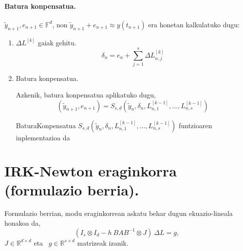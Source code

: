\paragraph*{Batura konpensatua.}

$\tilde{y}_{n+1}, e_{n+1} \in \mathbb{F}^d$, non $\tilde{y}_{n+1}+e_{n+1}\approx y(t_{n+1})$ era honetan kalkulatuko dugu:
\begin{enumerate}

\item $\Delta L^{[k]}$ gaiak gehitu.
\begin{equation*}
\delta_{n}={e}_{n} + \sum\limits_{j=1}^{s}\Delta L_{n,j}^{[k]}
\end{equation*}

\item Batura konpensatua.

Azkenik, batura konpensatua aplikatuko dugu,
\begin{equation}
\label{eq:bkLi2}
(\tilde y_{n+1}, e_{n+1}) = S_{s,d}(\tilde y_n, \delta_n, L_{n,1}^{[k-1]}, \dots,L_{n,s}^{[k-1]})
\end{equation}
 
\begin{algorithm}[H]
  \SetAlgoLined\DontPrintSemicolon
  \caption{BaturaKonpensatua $S_{s,d}(\tilde y_n, \delta_n, L_{n,1}^{[k-1]}, \dots,L_{n,s}^{[k-1]})$ funtzioaren inplementazioa da}
\end{algorithm} 

\end{enumerate}

\section{IRK-Newton eraginkorra (formulazio berria).}
\label{sec:7.5}

Formulazio berrian, modu eraginkorrean askatu behar dugun ekuazio-lineala honakoa da, 
\begin{equation}
\label{eq:linsysZG}
(I_s \otimes I_d - h \ BAB^{-1} \otimes J) \ \Delta L = g, 
\end{equation}
$J \in \mathbb{R}^{d \times d}$  eta ~$g \in \mathbb{R}^{s \times d}$ matrizeak izanik. 

